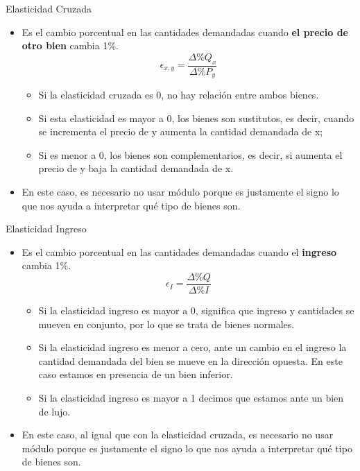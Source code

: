 \documentclass{beamer}
\begin{document}
\begin{frame}{Elasticidad Cruzada}
    \begin{itemize}
        \item Es el cambio porcentual en las cantidades demandadas cuando \textbf{el precio de otro bien} cambia 1\%.
        \begin{equation*}
            \epsilon_{x,y} = \frac{\Delta \% Q_x}{\Delta \% P_y}
        \end{equation*}
            \begin{itemize}
            \item Si la elasticidad cruzada es 0, no hay relación entre ambos bienes.
            \item Si esta elasticidad es mayor a 0, los bienes son sustitutos, es decir, cuando se incrementa el precio de y aumenta la cantidad demandada de x; 
            \item Si es menor a 0, los bienes son complementarios, es decir, si aumenta el precio de y baja la cantidad demandada de x.
            \end{itemize}
        \item En este caso, es necesario no usar módulo porque es justamente el signo lo que nos ayuda a interpretar qué tipo de bienes son.
    \end{itemize}
\end{frame}

\begin{frame}{Elasticidad Ingreso}
  \begin{itemize}
    \item Es el cambio porcentual en las cantidades demandadas cuando el \textbf{ingreso} cambia 1\%.
    \begin{equation*}
      \epsilon_I = \frac{\Delta \% Q}{\Delta \% I}
    \end{equation*}    
    \begin{itemize}
        \item Si la elasticidad ingreso es mayor a 0, significa que ingreso y cantidades se mueven en conjunto, por lo que se trata de bienes normales.
        \item Si la elasticidad ingreso es menor a cero, ante un cambio en el ingreso la cantidad demandada del bien se mueve en la dirección opuesta. En este caso estamos en presencia de un bien inferior.
        \item Si la elasticidad ingreso es mayor a 1 decimos que estamos ante un bien de lujo.
    \end{itemize}
    \item  En este caso, al igual que con la elasticidad cruzada, es necesario no usar módulo porque es justamente el signo lo que nos ayuda a interpretar qué tipo de bienes son.
\end{itemize}
\end{frame}
\end{document}
